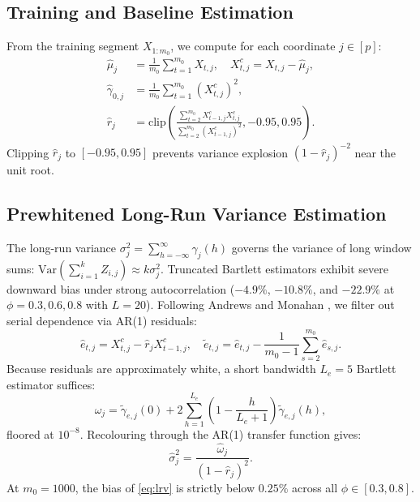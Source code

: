 \documentclass[lettersize,journal]{IEEEtran}
\begin{document}
\subsection{Training and Baseline Estimation}
From the training segment $X_{1:m_0}$, we compute for each coordinate $j \in [p]$:
\begin{align}
    \hat{\mu}_j &= \frac{1}{m_0} \sum_{t=1}^{m_0} X_{t,j}, \quad X^c_{t,j} = X_{t,j} - \hat{\mu}_j, \label{eq:mu} \\
    \hat{\gamma}_{0,j} &= \frac{1}{m_0} \sum_{t=1}^{m_0} (X^c_{t,j})^2, \label{eq:gamma} \\
    \hat{r}_j &= \text{clip}\left( \frac{\sum_{t=2}^{m_0} X^c_{t-1,j} X^c_{t,j}}{\sum_{t=2}^{m_0} (X^c_{t-1,j})^2}, -0.95, 0.95 \right). \label{eq:rhat}
\end{align}
Clipping $\hat{r}_j$ to $[-0.95, 0.95]$ prevents variance explosion $(1 - \hat{r}_j)^{-2}$ near the unit root.

\subsection{Prewhitened Long-Run Variance Estimation}
The long-run variance $\sigma_j^2 = \sum_{h=-\infty}^\infty \gamma_j(h)$ governs the variance of long window sums: $\text{Var}(\sum_{i=1}^k Z_{i,j}) \approx k \sigma_j^2$. Truncated Bartlett estimators exhibit severe downward bias under strong autocorrelation ($-4.9\%$, $-10.8\%$, and $-22.9\%$ at $\phi = 0.3, 0.6, 0.8$ with $L=20$). Following Andrews and Monahan \cite{andrews1992improved}, we filter out serial dependence via AR(1) residuals:
\begin{equation}
    \hat{e}_{t,j} = X^c_{t,j} - \hat{r}_j X^c_{t-1,j}, \quad \tilde{e}_{t,j} = \hat{e}_{t,j} - \frac{1}{m_0-1} \sum_{s=2}^{m_0} \hat{e}_{s,j}. \label{eq:innov}
\end{equation}
Because residuals are approximately white, a short bandwidth $L_e = 5$ Bartlett estimator suffices:
\begin{equation}
    \hat{\omega}_j = \tilde{\gamma}_{e,j}(0) + 2 \sum_{h=1}^{L_e} \left( 1 - \frac{h}{L_e+1} \right) \tilde{\gamma}_{e,j}(h), \label{eq:bartlett}
\end{equation}
floored at $10^{-8}$. Recolouring through the AR(1) transfer function gives:
\begin{equation}
    \hat{\sigma}_j^2 = \frac{\hat{\omega}_j}{(1 - \hat{r}_j)^2}. \label{eq:lrv}
\end{equation}
At $m_0 = 1000$, the bias of \eqref{eq:lrv} is strictly below $0.25\%$ across all $\phi \in [0.3, 0.8]$.
\end{document}
